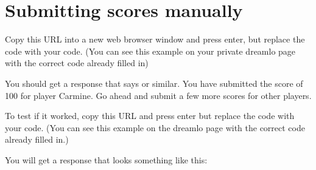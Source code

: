 \documentclass[letterpaper,10pt,english]{sphinxmanual}
\begin{document}
\begin{sphinxVerbatim}[commandchars=\\\{\}]
   
   
\end{sphinxVerbatim}


\section{Submitting scores manually}
\label{\detokenize{tutorial:submitting-scores-manually}}
\sphinxAtStartPar
Copy this URL into a new web browser window and press enter, but replace
the code with your  code. (You can see this example on your
private dreamlo page with the correct code already filled in)

\begin{sphinxVerbatim}[commandchars=\\\{\}]
\end{sphinxVerbatim}

\sphinxAtStartPar
{}

\sphinxAtStartPar
You should get a response that says  or similar. You have submitted
the score of 100 for player Carmine. Go ahead and submit a few more
scores for other players.

\sphinxAtStartPar
To test if it worked, copy this URL and press enter but replace the code
with your  code. (You can see this example on the dreamlo page
with the correct code already filled in.)

\begin{sphinxVerbatim}[commandchars=\\\{\}]
\end{sphinxVerbatim}

\sphinxAtStartPar
You will get a response that looks something like this:
\end{document}
